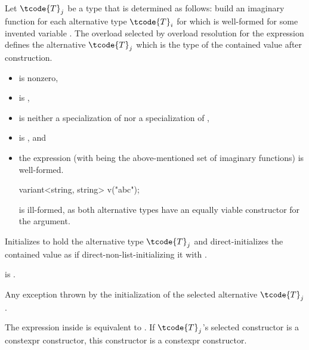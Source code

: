 \begin{itemdescr}
\pnum
Let $\tcode{T}_j$ be a type that is determined as follows:
build an imaginary function 
for each alternative type $\tcode{T}_i$
for which  
is well-formed for some invented variable .
The overload  selected by overload
resolution for the expression  defines
the alternative $\tcode{T}_j$ which is the type of the contained value after
construction.

\pnum
\constraints
\begin{itemize}
\item
{} is nonzero,

\item
{} is ,

\item
{} is neither
a specialization of  nor
a specialization of ,

\item
{} is , and

\item
the expression \brk{}
(with  being the above-mentioned set of
imaginary functions) is well-formed.
\begin{note}
\begin{codeblock}
variant<string, string> v("abc");
\end{codeblock}
is ill-formed, as both alternative types have an equally viable constructor
for the argument.
\end{note}
\end{itemize}

\pnum
\effects
Initializes  to hold the alternative type $\tcode{T}_j$ and
direct-initializes the contained value as if direct-non-list-initializing it
with .

\pnum
\ensures
{} is .

\pnum
\throws
Any exception thrown by the initialization of the selected alternative $\tcode{T}_j$.

\pnum
\remarks
The expression inside  is equivalent to
.
If $\tcode{T}_j$'s selected constructor is a constexpr constructor,
this constructor is a constexpr constructor.
\end{itemdescr}

